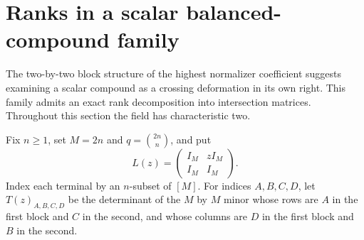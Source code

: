 \section{Ranks in a scalar balanced-compound family}
\label{sec:balanced-compound}

The two-by-two block structure of the highest normalizer coefficient
suggests examining a scalar compound as a crossing deformation in its
own right. This family admits an exact rank decomposition into
intersection matrices. Throughout this section the field has
characteristic two.

Fix $n\geq1$, set $M=2n$ and $q=\binom{2n}{n}$, and put
\[
 L(z)=\begin{pmatrix}I_M&zI_M\\ I_M&I_M\end{pmatrix}.
\]
Index each terminal by an $n$-subset of $[M]$. For indices $A,B,C,D$,
let $T(z)_{A,B,C,D}$ be the determinant of the $M$ by $M$ minor
whose rows are $A$ in the first block and $C$ in the second, and
whose columns are $D$ in the first block and $B$ in the second.

